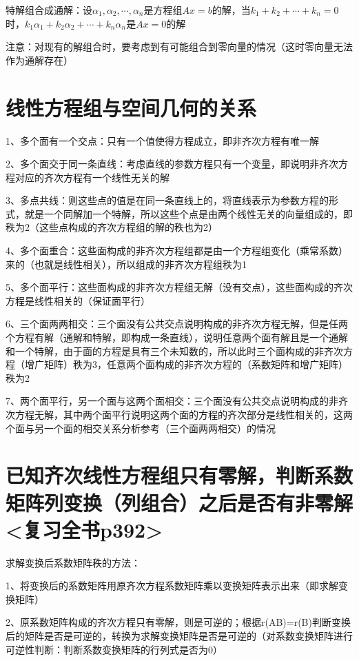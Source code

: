 特解组合成通解：设$\alpha_1,\alpha_2,\cdots,\alpha_n$是方程组$Ax=b$的解，当$k_1+k_2+\cdots+k_n=0$时，$k_1\alpha_1+k_2\alpha_2+\cdots+k_n\alpha_n $是$Ax=0$的解

注意：对现有的解组合时，要考虑到有可能组合到零向量的情况（这时零向量无法作为通解存在）

\section{线性方程组与空间几何的关系}

1、多个面有一个交点：只有一个值使得方程成立，即非齐次方程有唯一解

2、多个面交于同一条直线：考虑直线的参数方程只有一个变量，即说明非齐次方程对应的齐次方程有一个线性无关的解

3、多点共线：则这些点的值是在同一条直线上的，将直线表示为参数方程的形式，就是一个同解加一个特解，所以这些个点是由两个线性无关的向量组成的，即秩为2（这些点构成的齐次方程组的解的秩也为2）

4、多个面重合：这些面构成的非齐次方程组都是由一个方程组变化（乘常系数）来的（也就是线性相关），所以组成的非齐次方程组秩为1

5、多个面平行：这些面构成的非齐次方程组无解（没有交点），这些面构成的齐次方程是线性相关的（保证面平行）

6、三个面两两相交：三个面没有公共交点说明构成的非齐次方程无解，但是任两个方程有解（通解和特解，即构成一条直线），说明任意两个面有解且是一个通解和一个特解，由于面的方程是具有三个未知数的，所以此时三个面构成的非齐次方程（增广矩阵）秩为3，任意两个面构成的非齐次方程的（系数矩阵和增广矩阵）秩为2

7、两个面平行，另一个面与这两个面相交：三个面没有公共交点说明构成的非齐次方程无解，其中两个面平行说明这两个面的方程的齐次部分是线性相关的，这两个面与另一个面的相交关系分析参考（三个面两两相交）的情况

\section{已知齐次线性方程组只有零解，判断系数矩阵列变换（列组合）之后是否有非零解<复习全书p392>}

求解变换后系数矩阵秩的方法：

1、将变换后的系数矩阵用原齐次方程系数矩阵乘以变换矩阵表示出来（即求解变换矩阵）

2、原系数矩阵构成的齐次方程只有零解，则是可逆的；根据r(AB)=r(B)判断变换后的矩阵是否是可逆的，转换为求解变换矩阵是否是可逆的（对系数变换矩阵进行可逆性判断：判断系数变换矩阵的行列式是否为0）

